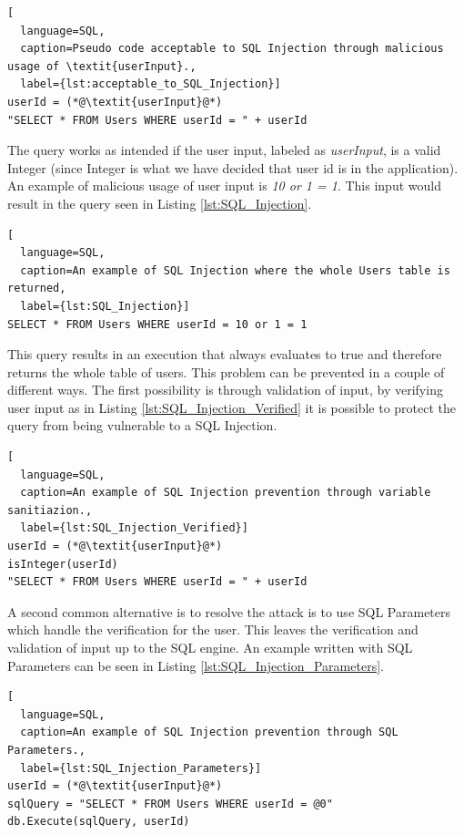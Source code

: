\hfill
\begin{lstlisting}[
  language=SQL,
  caption=Pseudo code acceptable to SQL Injection through malicious usage of \textit{userInput}.,
  label={lst:acceptable_to_SQL_Injection}]
userId = (*@\textit{userInput}@*)
"SELECT * FROM Users WHERE userId = " + userId
\end{lstlisting}
\hfill

The query works as intended if the user input, labeled as \textit{userInput}, is a valid Integer (since Integer is what we have decided that user id is in the application). An example of malicious usage of user input is \textit{10 or 1 = 1}. This input would result in the query seen in Listing \ref{lst:SQL_Injection}.

\hfill
\begin{lstlisting}[
  language=SQL,
  caption=An example of SQL Injection where the whole Users table is returned,
  label={lst:SQL_Injection}]
SELECT * FROM Users WHERE userId = 10 or 1 = 1
\end{lstlisting}
\hfill

This query results in an execution that always evaluates to true and therefore returns the whole table of users. This problem can be prevented in a couple of different ways. The first possibility is through validation of input, by verifying user input as in Listing \ref{lst:SQL_Injection_Verified} it is possible to protect the query from being vulnerable to a SQL Injection.

\hfill
\begin{lstlisting}[
  language=SQL,
  caption=An example of SQL Injection prevention through variable sanitiazion.,
  label={lst:SQL_Injection_Verified}]
userId = (*@\textit{userInput}@*)
isInteger(userId)
"SELECT * FROM Users WHERE userId = " + userId
\end{lstlisting}
\hfill

A second common alternative is to resolve the attack is to use SQL Parameters which handle the verification for the user. This leaves the verification and validation of input up to the SQL engine. An example written with SQL Parameters can be seen in Listing \ref{lst:SQL_Injection_Parameters}.

\hfill
\begin{lstlisting}[
  language=SQL,
  caption=An example of SQL Injection prevention through SQL Parameters.,
  label={lst:SQL_Injection_Parameters}]
userId = (*@\textit{userInput}@*)
sqlQuery = "SELECT * FROM Users WHERE userId = @0"
db.Execute(sqlQuery, userId)
\end{lstlisting}




